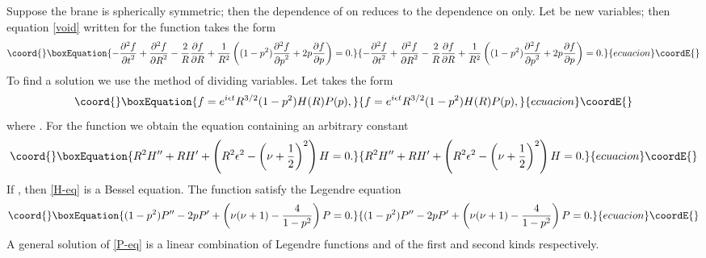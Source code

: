 \documentclass[letterpaper,12pt]{article}
\begin{document}
Suppose the brane is spherically symmetric; then the dependence of
\coordHE{} on \coordHE{} reduces to the dependence on
\coordHE{} only. Let  \coordHE{} be new variables; then equation
\eqref{void} written for the function \coordHE{} takes the form
\begin{equation}\coord{}\boxEquation{
\label{tRp-eq} -\frac{\partial^2 f}{{\partial t}^2}+
\frac{\partial^2 f}{{\partial R}^2}- \frac{2}{R}\frac{\partial
f}{\partial R}+\frac{1}{R^2}\left((1-p^2)\frac{\partial^2
f}{{\partial p}^2} +2p\frac{\partial f}{\partial p}\right)=0.
}{
-\frac{\partial^2 f}{{\partial t}^2}+
\frac{\partial^2 f}{{\partial R}^2}- \frac{2}{R}\frac{\partial
f}{\partial R}+\frac{1}{R^2}\left((1-p^2)\frac{\partial^2
f}{{\partial p}^2} +2p\frac{\partial f}{\partial p}\right)=0.
}{ecuacion}\coordE{}\end{equation}
To find a solution we use the method of dividing variables. Let
\coordHE{} takes the form
\begin{equation}\coord{}\boxEquation{
\label{ansatz}
 f=e^{i\epsilon t}R^{3/2}(1-p^2)H(R)P(p),
}{
f=e^{i\epsilon t}R^{3/2}(1-p^2)H(R)P(p),
}{ecuacion}\coordE{}\end{equation}
where \coordHE{}. For the function \coordHE{}  we obtain the
equation containing an arbitrary constant  \myHighlight{$\nu$}\coordHE{}
\begin{equation}\coord{}\boxEquation{
\label{H-eq}
 R^2H^{\prime\prime}+RH^{\prime}+\left(R^2\epsilon^2
 -\left(\nu+\frac{1}{2}\right)^2\right)H=0.
}{
R^2H^{\prime\prime}+RH^{\prime}+\left(R^2\epsilon^2
 -\left(\nu+\frac{1}{2}\right)^2\right)H=0.
}{ecuacion}\coordE{}\end{equation}
If \coordHE{}, then \eqref{H-eq} is a Bessel equation. The
function \coordHE{} satisfy the  Legendre equation
\begin{equation}\coord{}\boxEquation{
\label{P-eq} (1-p^2)P^{\prime\prime}-2pP^{\prime}+
\left(\nu(\nu+1)-\frac{4}{1-p^2}\right)P=0.
}{
(1-p^2)P^{\prime\prime}-2pP^{\prime}+
\left(\nu(\nu+1)-\frac{4}{1-p^2}\right)P=0.
}{ecuacion}\coordE{}\end{equation}
A general solution \coordHE{} of \eqref{P-eq} is a linear
combination of Legendre functions \coordHE{} and \coordHE{} of
the first and second kinds respectively.
\end{document}
